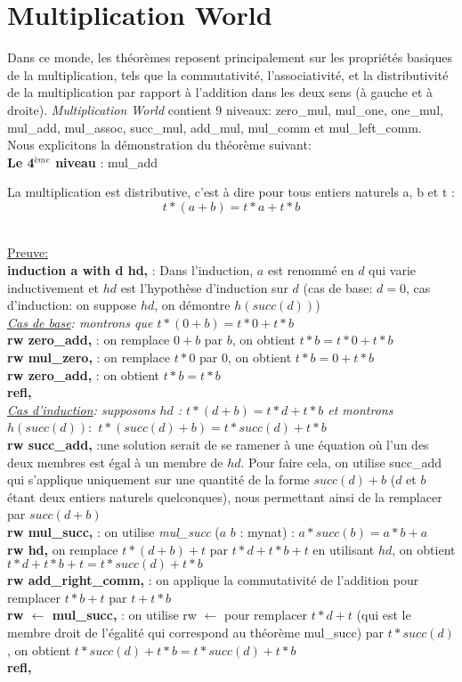 \documentclass{article}
\begin{document}
\section{Multiplication World}
Dans ce monde, les théorèmes reposent principalement sur les propriétés basiques de la multiplication, tels que la commutativité, l'associativité, et la distributivité de la multiplication par rapport à l'addition dans les deux sens (à gauche et à droite). \textit{Multiplication World} contient 9 niveaux: zero\_mul, mul\_one, one\_mul, mul\_add, mul\_assoc, succ\_mul, add\_mul, mul\_comm et mul\_left\_comm.\\ Nous explicitons la démonstration du théorème suivant: \\
\textbf{Le 4$^{ème}$ niveau} : mul\_add  \begin{center} La multiplication est distributive, c'est à dire pour tous entiers naturels a, b et t : $$t*(a+b)=t*a+t*b$$ \end{center}\\
{\large\underline{Preuve:}} \\
\textbf{induction a with d hd,} : Dans l'induction, \textbf{$a$} est renommé en \textbf{$d$} qui varie inductivement et \textbf{$hd$} est l'hypothèse d'induction sur $d$ (cas de base: $d=0$, cas d'induction: on suppose $hd$, on démontre $h(succ(d))$)   \\
\textit{\underline{Cas de base}: montrons que $t * (0 + b) = t * 0 + t * b$}\\
\textbf{rw zero\_add,} : on remplace $0+b$ par $b$, on obtient $t*b=t*0+t*b$ \\
\textbf{rw mul\_zero,} : on remplace $t*0$ par $0$, on obtient $t*b=0+t*b$ \\
\textbf{rw zero\_add,} : on obtient $t*b=t*b$ \\
\textbf{refl,} \\
\textit{\underline{Cas d'induction}: supposons $hd$ : $t*(d+b) = t * d + t * b$ et montrons $h(succ(d)):$ $t * (succ (d) + b) = t * succ (d) + t * b$ }\\
\textbf{rw succ\_add,} :une solution serait de se ramener à une équation où l'un des deux membres est égal à un membre de $hd$. Pour faire cela, on utilise succ\_add qui s'applique uniquement sur une quantité de la forme $succ(d)+b$ ($d$ et $b$ étant deux entiers naturels quelconques), nous permettant ainsi de la remplacer par $succ(d+b)$\\
\textbf{rw mul\_succ,} : on utilise \textit{mul\_succ} ($a$ $b$ : mynat) : $a * succ(b) = a * b + a $\\
\textbf{rw hd,} on remplace $t * (d + b) + t$ par $t * d + t * b+t$ en utilisant $hd$, on obtient $ t * d + t * b + t = t * succ(d) + t * b$\\
\textbf{rw add\_right\_comm,} : on applique la commutativité de l'addition pour remplacer $t * b + t$ par $ t + t * b$\\
\textbf{rw $\leftarrow$  mul\_succ, }: on utilise rw $\leftarrow$ pour remplacer $t * d + t$ (qui est le membre droit de l'égalité qui correspond au théorème mul\_succ) par $t * succ (d)$, on obtient $t * succ(d) + t * b = t * succ(d) + t * b$\\
\textbf{refl,} \\
\end{document}
